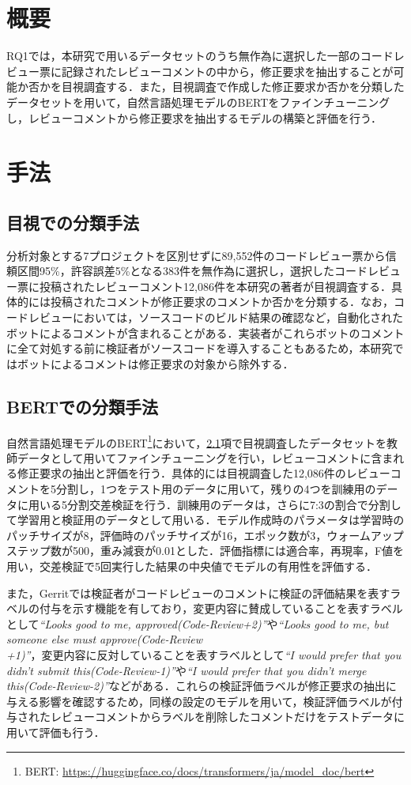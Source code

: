 \documentclass[11pt]{jreport}
\begin{document}
\section{概要}
RQ1では，本研究で用いるデータセットのうち無作為に選択した一部のコードレビュー票に記録されたレビューコメントの中から，修正要求を抽出することが可能か否かを目視調査する．また，目視調査で作成した修正要求か否かを分類したデータセットを用いて，自然言語処理モデルのBERTをファインチューニングし，レビューコメントから修正要求を抽出するモデルの構築と評価を行う．

\section{手法}
\subsection{目視での分類手法}\label{subsec:request_manual_method}
分析対象とする7プロジェクトを区別せずに89,552件のコードレビュー票から信頼区間95\%，許容誤差5\%となる383件を無作為に選択し，選択したコードレビュー票に投稿されたレビューコメント12,086件を本研究の著者が目視調査する．具体的には投稿されたコメントが修正要求のコメントか否かを分類する．なお，コードレビューにおいては，ソースコードのビルド結果の確認など，自動化されたボットによるコメントが含まれることがある．実装者がこれらボットのコメントに全て対処する前に検証者がソースコードを導入することもあるため，本研究ではボットによるコメントは修正要求の対象から除外する．

\subsection{BERTでの分類手法}
自然言語処理モデルのBERT\footnote{BERT: \url{https://huggingface.co/docs/transformers/ja/model_doc/bert}}において，\ref{subsec:request_manual_method}項で目視調査したデータセットを教師データとして用いてファインチューニングを行い，レビューコメントに含まれる修正要求の抽出と評価を行う．具体的には目視調査した12,086件のレビューコメントを5分割し，1つをテスト用のデータに用いて，残りの4つを訓練用のデータに用いる5分割交差検証を行う．訓練用のデータは，さらに7:3の割合で分割して学習用と検証用のデータとして用いる．モデル作成時のパラメータは学習時のパッチサイズが8，評価時のパッチサイズが16，エポック数が3，ウォームアップステップ数が500，重み減衰が0.01とした．評価指標には適合率，再現率，F値を用い，交差検証で5回実行した結果の中央値でモデルの有用性を評価する．

また，Gerritでは検証者がコードレビューのコメントに検証の評価結果を表すラベルの付与を示す機能を有しており，変更内容に賛成していることを表すラベルとして\textit{``Looks good to me, approved(Code-Review+2)''}や\textit{``Looks good to me, but someone else must approve(Code-Review\\+1)''}，変更内容に反対していることを表すラベルとして\textit{``I would prefer that you didn't submit this(Code-Review-1)''}や\textit{``I would prefer that you didn't merge this(Code-Review-2)''}などがある．これらの検証評価ラベルが修正要求の抽出に与える影響を確認するため，同様の設定のモデルを用いて，検証評価ラベルが付与されたレビューコメントからラベルを削除したコメントだけをテストデータに用いて評価も行う．
\end{document}
